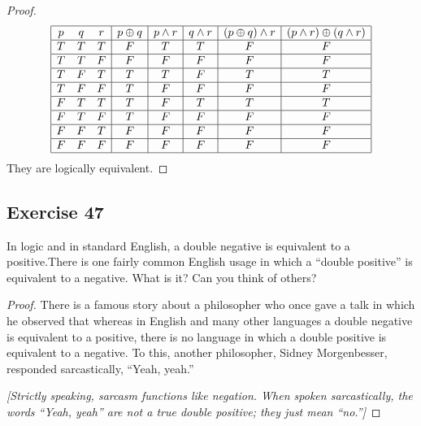 \documentclass[14pt]{extarticle}
\begin{document}
\begin{proof}
    $$
        \begin{array}{|ccc|c|c|c|c|c|}
            \hline
            p & q & r & p \oplus q & p \wedge r & q \wedge r & (p \oplus q) \wedge r & (p \wedge r) \oplus (q \wedge r) \\
            \hline
            T & T & T & F          & T          & T          & F                     & F                                \\
            \hline
            T & T & F & F          & F          & F          & F                     & F                                \\
            \hline
            T & F & T & T          & T          & F          & T                     & T                                \\
            \hline
            T & F & F & T          & F          & F          & F                     & F                                \\
            \hline
            F & T & T & T          & F          & T          & T                     & T                                \\
            \hline
            F & T & F & T          & F          & F          & F                     & F                                \\
            \hline
            F & F & T & F          & F          & F          & F                     & F                                \\
            \hline
            F & F & F & F          & F          & F          & F                     & F                                \\
            \hline
        \end{array}
    $$
    They are logically equivalent.
\end{proof}

\subsection{Exercise 47}
In logic and in standard English, a double negative is equivalent to a positive.There is one fairly common English usage in which a “double positive” is equivalent to a negative. What is it? Can you think of others?

\begin{proof} There is a famous story about a philosopher who once gave a talk in which he observed that whereas in English and many other languages a double negative is equivalent to a positive, there is no language in which a double positive is equivalent to a negative. To this, another philosopher, Sidney
    Morgenbesser, responded sarcastically, “Yeah, yeah.”

    {\it [Strictly speaking, sarcasm functions like negation. When spoken sarcastically, the words “Yeah, yeah” are not a true double positive; they just mean “no.”]}
\end{proof}
\end{document}
